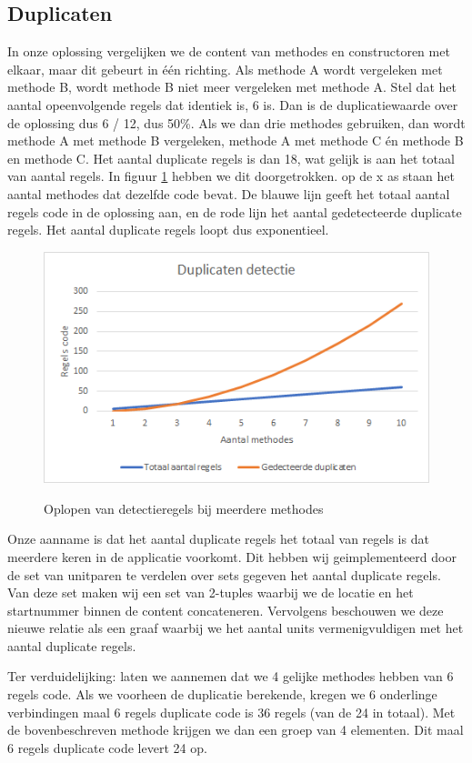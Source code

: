 \documentclass[a4paper]{article}
\begin{document}
\subsection{Duplicaten}
In onze oplossing vergelijken we de content van methodes en constructoren met elkaar, maar dit gebeurt in één richting. Als methode A wordt vergeleken met methode B, wordt methode B niet meer vergeleken met methode A. Stel dat het aantal opeenvolgende regels dat identiek is, 6 is. Dan is de duplicatiewaarde over de oplossing dus 6 / 12, dus 50\%. Als we dan drie methodes gebruiken, dan wordt methode A met methode B vergeleken, methode A met methode C én methode B en methode C. Het aantal duplicate regels is dan 18, wat gelijk is aan het totaal van aantal regels. In figuur \ref{fig:DuplicatenDetectie} hebben we dit doorgetrokken. op de x as staan het aantal methodes dat dezelfde code bevat. De blauwe lijn geeft het totaal aantal regels code in de oplossing aan, en de rode lijn het aantal gedetecteerde duplicate regels. Het aantal duplicate regels loopt dus exponentieel.
\begin{figure}[htbp]
\caption{Oplopen van detectieregels bij meerdere methodes}
\centering
\includegraphics[width=0.8 \textwidth]{DuplicatenDetectie.png}
\label{fig:DuplicatenDetectie}
\end{figure}
Onze aanname is dat het aantal duplicate regels het totaal van regels is dat meerdere keren in de applicatie voorkomt. Dit hebben wij geimplementeerd door de set van unitparen te verdelen over sets gegeven het aantal duplicate regels. Van deze set maken wij een set van 2-tuples waarbij we de locatie en het startnummer binnen de content concateneren. Vervolgens beschouwen we deze nieuwe relatie als een graaf waarbij we het aantal units vermenigvuldigen met het aantal duplicate regels.

Ter verduidelijking: laten we aannemen dat we 4 gelijke methodes hebben van 6 regels code. Als we voorheen de duplicatie berekende, kregen we 6 onderlinge verbindingen maal 6 regels duplicate code is 36 regels (van de 24 in totaal). Met de bovenbeschreven methode krijgen we dan een groep van 4 elementen. Dit maal 6 regels duplicate code levert 24 op.
\end{document}
